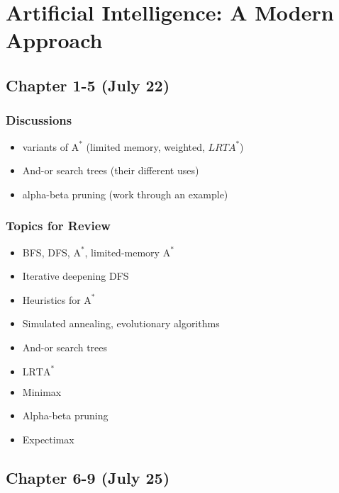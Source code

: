 \section{Artificial Intelligence: A Modern Approach}

\subsection{Chapter 1-5 (July 22)}

\subsubsection*{Discussions}
\begin{itemize}
\item variants of $\text{A}^*$ (limited memory, weighted, $LRTA^*$)
\item And-or search trees (their different uses)
\item alpha-beta pruning (work through an example)
\end{itemize}

\subsubsection*{Topics for Review}
\begin{itemize}
\item BFS, DFS, $\text{A}^*$, limited-memory $\text{A}^*$
\item Iterative deepening DFS
\item Heuristics for $\text{A}^*$
\item Simulated annealing, evolutionary algorithms
\item And-or search trees
\item $\text{LRTA}^*$
\item Minimax
\item Alpha-beta pruning
\item Expectimax
\end{itemize}

\subsection{Chapter 6-9 (July 25)}
